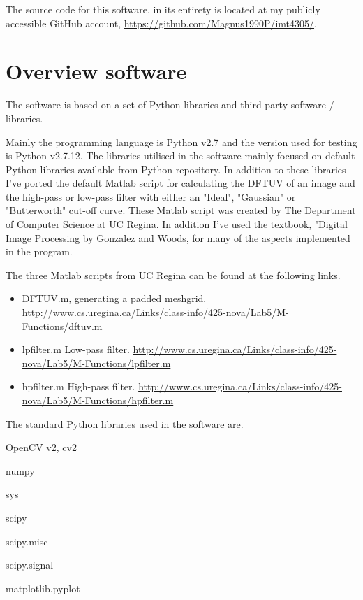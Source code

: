 The source code for this software, in its entirety is located at my publicly
accessible GitHub account\cite{git}, \url{https://github.com/Magnus1990P/imt4305/}.


\section{Overview software}
The software is based on a set of Python libraries and third-party software /
libraries.

Mainly the programming language is Python v2.7 and the version used for testing
is Python v2.7.12. The libraries utilised in the software mainly focused on
default Python libraries available from Python repository. In addition to these
libraries I've ported the default Matlab script for calculating the DFTUV of an
image and the high-pass or low-pass filter with either an "Ideal", "Gaussian" or
"Butterworth" cut-off curve. These Matlab script was created by The Department
of Computer Science at UC Regina.  In addition I've used the textbook, "Digital
Image Processing by Gonzalez and Woods\cite{fip}, for many of the aspects
implemented in the program.

The three Matlab scripts from UC Regina can be found at the following links.
\begin{itemize}
	\item DFTUV.m, generating a padded meshgrid.\cite{ucr_dftuv}
		\url{http://www.cs.uregina.ca/Links/class-info/425-nova/Lab5/M-Functions/dftuv.m}
	\item lpfilter.m Low-pass filter.\cite{ucr_lpfilter}
		\url{http://www.cs.uregina.ca/Links/class-info/425-nova/Lab5/M-Functions/lpfilter.m}
	\item hpfilter.m High-pass filter.\cite{ucr_hpfilter}
		\url{http://www.cs.uregina.ca/Links/class-info/425-nova/Lab5/M-Functions/hpfilter.m}
\end{itemize}

The standard Python libraries used in the software are.
\begin{itemize}
\begin{multicols}{3}
	\item OpenCV v2, cv2
	\item numpy
	\item sys
	\item scipy
	\item scipy.misc
	\item scipy.signal
	\item matplotlib.pyplot
\end{multicols}
\end{itemize}



